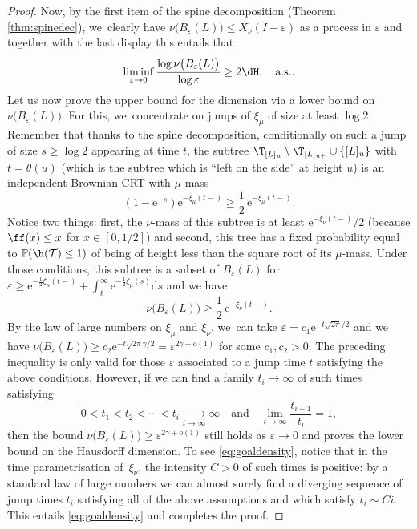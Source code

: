 \begin{proof}
Now, by the first item of the spine decomposition (Theorem \ref{thm:spinedec}), we~clearly have $\nu\big(B_{ \varepsilon }(L)\big) \leq X_\nu(I - \varepsilon)$ as a process in $ \varepsilon$ and together with the last display this entails that
\[
\liminf_{ \varepsilon \to 0} \frac{\log \nu \big(B_\varepsilon(L)\big) }{\log \varepsilon} \geq 2 \dH, \quad \text{a.s.}.
\]
Let us now prove the upper bound for the dimension via a lower bound on $\nu \big(B_\varepsilon(L)\big)$. For this, we~concentrate on jumps of $\xi_\mu$ of size at least $\log 2$. Remember that thanks to the spine decomposition, conditionally on such a jump of size $s\geq \log 2$ appearing at time $t$, the subtree $\T_{[L]_{u}}\setminus \T_{[L]_{u+}} \cup \{[L]_{u}\}$ with $t=\theta(u)$ (which is the subtree which is ``left on the side'' at height $u$) is an independent Brownian CRT with $\mu$-mass
\[
(1- \mathrm{e}^{-s}) \mathrm{e}^{- \xi_\mu(t-)} \geq \frac{1}{2}\, \mathrm{e}^{- \xi_\mu(t-)}.
\]
Notice two things: first, the $\nu$-mass of this subtree is at least $ \mathrm{e}^{- \xi_\nu(t-)}/2$ (because $\ff(x) \leq x$ for $x \in [0,1/2]$) and second, this tree has a fixed probability equal to $ \mathbb{P}(\h(\mathcal{T}) \leq 1)$ of being of height less than the square root of its $\mu$-mass. Under those conditions, this subtree is a subset of $B_{ \varepsilon}(L)$ for $\varepsilon \geq \mathrm{e}^{-\frac12 \xi_\mu(t-)} + \int_{t}^\infty \mathrm{e}^{-\frac12 \xi_\mu(s)} \mathrm{d}s$ and we have
\begin{equation} \label{eq:lowerbound12}\nu \big(B_{ \varepsilon}(L)\big) \geq \frac12\, \mathrm{e}^{- \xi_\nu(t-)}.
\end{equation} By the law of large numbers on $\xi_\mu$ and $\xi_\nu$, we~can take $\varepsilon = c_1 \mathrm{e}^{- t \sqrt{2\pi}/2}$ and we have $\nu \big(B_{ \varepsilon}(L)\big) \geq c_2 \mathrm{e}^{- t \sqrt{2\pi} \gamma/2} = \varepsilon^{2\gamma + o(1)}$ for some $c_1,c_2>0$. The preceding inequality is only valid for those $ \varepsilon$ associated to a jump time $t$ satisfying the above conditions. However, if we can find a family $t_i \to \infty$ of such times satisfying
\begin{equation} \label{eq:goaldensity} 0 < t_1 < t_2 < \cdots < t_i \xrightarrow[\textstyle i \to \infty]{} \infty \quad \text{and} \quad\lim_{t \to \infty} \frac{t_{i+1}}{t_i} =1,
\end{equation}
then the bound $\nu \big(B_{ \varepsilon}(L)\big) \geq \varepsilon^{2\gamma + o(1)}$ still holds as $ \varepsilon \to 0$ and proves the lower bound on the Hausdorff dimension. To see \eqref{eq:goaldensity}, notice that in the time parametrisation of~$\xi_\nu$, the intensity $C>0$ of such times is positive: by a standard law of large numbers we can almost surely find a diverging sequence of jump times $t_i$ satisfying all of the above assumptions and which satisfy $t_i \sim C i$. This entails \eqref{eq:goaldensity} and completes the proof.
\end{proof}


